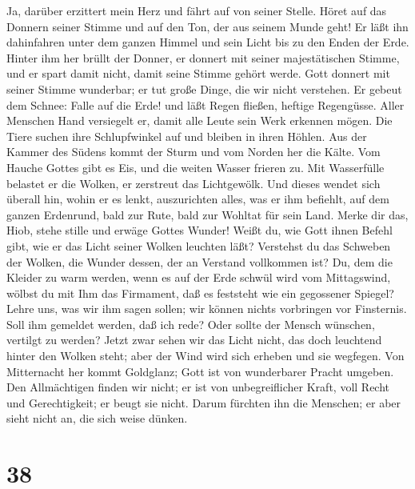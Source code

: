  Ja, darüber erzittert mein Herz und fährt auf von seiner
Stelle.  Höret auf das Donnern seiner Stimme und auf den
Ton, der aus seinem Munde geht!  Er läßt ihn dahinfahren
unter dem ganzen Himmel und sein Licht bis zu den Enden der Erde.
 Hinter ihm her brüllt der Donner, er donnert mit seiner
majestätischen Stimme, und er spart damit nicht, damit seine Stimme
gehört werde.  Gott donnert mit seiner Stimme wunderbar;
er tut große Dinge, die wir nicht verstehen.  Er gebeut
dem Schnee: Falle auf die Erde! und läßt Regen fließen, heftige
Regengüsse.  Aller Menschen Hand versiegelt er, damit alle
Leute sein Werk erkennen mögen.  Die Tiere suchen ihre
Schlupfwinkel auf und bleiben in ihren Höhlen.  Aus der
Kammer des Südens kommt der Sturm und vom Norden her die Kälte.
 Vom Hauche Gottes gibt es Eis, und die weiten Wasser
frieren zu.  Mit Wasserfülle belastet er die Wolken, er
zerstreut das Lichtgewölk.  Und dieses wendet sich
überall hin, wohin er es lenkt, auszurichten alles, was er ihm befiehlt,
auf dem ganzen Erdenrund,  bald zur Rute, bald zur
Wohltat für sein Land.  Merke dir das, Hiob, stehe stille
und erwäge Gottes Wunder!  Weißt du, wie Gott ihnen
Befehl gibt, wie er das Licht seiner Wolken leuchten läßt?
 Verstehst du das Schweben der Wolken, die Wunder dessen,
der an Verstand vollkommen ist?  Du, dem die Kleider zu
warm werden, wenn es auf der Erde schwül wird vom Mittagswind,
 wölbst du mit Ihm das Firmament, daß es feststeht wie
ein gegossener Spiegel?  Lehre uns, was wir ihm sagen
sollen; wir können nichts vorbringen vor Finsternis. 
Soll ihm gemeldet werden, daß ich rede? Oder sollte der Mensch wünschen,
vertilgt zu werden?  Jetzt zwar sehen wir das Licht
nicht, das doch leuchtend hinter den Wolken steht; aber der Wind wird
sich erheben und sie wegfegen.  Von Mitternacht her kommt
Goldglanz; Gott ist von wunderbarer Pracht umgeben.  Den
Allmächtigen finden wir nicht; er ist von unbegreiflicher Kraft, voll
Recht und Gerechtigkeit; er beugt sie nicht.  Darum
fürchten ihn die Menschen; er aber sieht nicht an, die sich weise
dünken.

\hypertarget{section-37}{%
\section{38}\label{section-37}}

